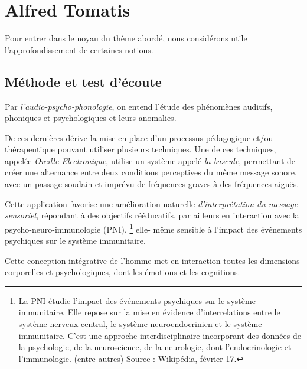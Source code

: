 \chapter{Alfred Tomatis}


Pour entrer dans le noyau du thème abordé, nous considérons utile
l'approfondissement de certaines notions.
\section{Méthode et test d'écoute}

Par {\textit{l'audio-psycho-phonologie}}, on entend l'étude des
phénomènes auditifs, phoniques et psychologiques et leurs anomalies.


De ces dernières dérive la mise en place d'un processus pédagogique
et/ou thérapeutique pouvant 
utiliser plusieurs techniques.
Une de ces techniques,
  appelée
\label{outil_oreille_electro}
\textit{Oreille Electronique}, utilise 
un système appelé \textit{ la 
bascule}, permettant de créer une alternance entre deux conditions perceptives 
du même message sonore, avec un passage soudain et imprévu de fréquences graves à des 
fréquences aiguës.


Cette application favorise une amélioration naturelle \emph{d'interprétation du message
sensoriel}, répondant à des objectifs rééducatifs, par ailleurs en
interaction avec la psycho-neuro-immunologie (PNI),
\footnote{La PNI étudie 
l'impact des événements psychiques sur le système immunitaire. Elle repose sur 
la mise en évidence d'interrelations entre le système
nerveux central, le système neuroendocrinien et le système immunitaire.
C'est une approche interdisciplinaire incorporant des données de la
psychologie, de la neuroscience, de la neurologie, dont l'endocrinologie
et l'immunologie. (entre autres) Source : Wikipédia, février 17.}
elle- même sensible à
l'impact des événements psychiques sur le système immunitaire.

Cette
conception intégrative de l'homme met en interaction toutes les
dimensions corporelles et psychologiques, dont les émotions et les cognitions.


